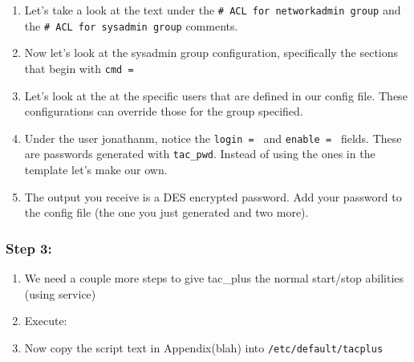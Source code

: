 \documentclass[main.tex]{subfiles}
\begin{document}
\begin{itemize}
\begin{enumerate}[noitemsep,label=$\bullet$,leftmargin=20mm,labelsep=0.5cm]
    \item Let's take a look at the text under the \texttt{# ACL for network\textunderscore admin group} and the \texttt{# ACL for sys\textunderscore admin group} comments.
    
    
    \item Now let's look at the sys\textunderscore admin group configuration, specifically the sections that begin with \texttt{cmd = }
    
    
    \item Let's look at the at the specific users that are defined in our config file. These configurations can override those for the group specified.
    
    \item Under the user jonathanm, notice the \texttt{login = } and \texttt{enable = } fields. These are passwords generated with \texttt{tac\_pwd}. Instead of using the ones in the template let's make our own.
    
    
    \item The output you receive is a DES encrypted password. Add your password to the config file (the one you just generated and two more). 
    
    
\end{enumerate}


\subsubsection{Step 3: }

\begin{enumerate}[noitemsep,label=$\bullet$,leftmargin=20mm,labelsep=0.5cm]    

\item We need a couple more steps to give tac\_plus the normal start/stop abilities (using service)

\item Execute:


\item Now copy the script text in Appendix(blah) into \texttt{/etc/default/tac\textunderscore plus}


\end{enumerate}
\end{itemize}
\end{document}
